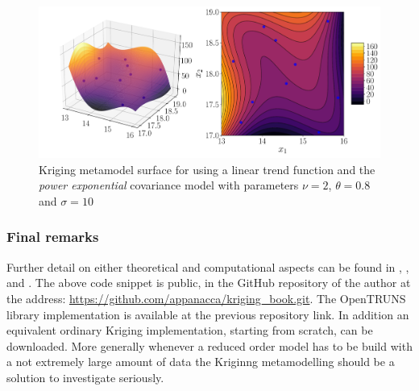 \begin{figure}[h]
	\centering
	\includegraphics[width=0.9\linewidth]{appendix_a/kriging_openturns3}
	\caption{Kriging metamodel surface for using a linear trend function and the \textit{power exponential} covariance model with parameters $\nu=2$, $\theta=0.8$ and $\sigma=10$}
	\label{fig:kriging_openturns3}
\end{figure}


\subsubsection{Final remarks}
Further detail on either theoretical and computational aspects can be found in \citet{cavazzuti2012optimization}, \citet{dakota}, \citet{sacks1989design} and \citet{openturns}.
The above code snippet is public, in the GitHub repository of the author at the address: \url{https://github.com/appanacca/kriging_book.git}.
The OpenTRUNS library implementation is available at the previous repository link. In addition an equivalent ordinary Kriging implementation, starting from scratch, can be downloaded.
More generally whenever a reduced order model has to be build with a not extremely large amount of data the Kriginng metamodelling should be a solution to investigate seriously.
